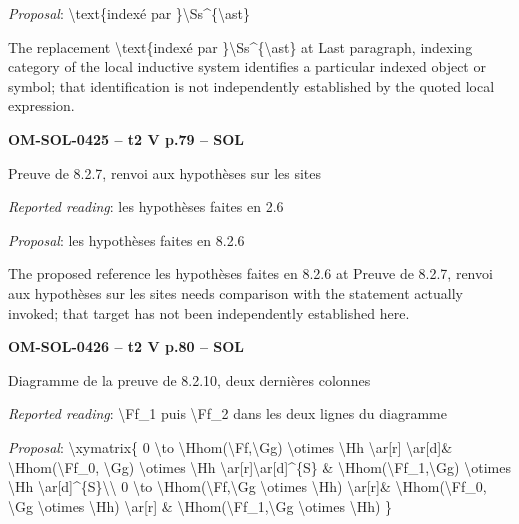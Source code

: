\emph{Proposal}: \textbackslash{}text\{indexé par \}\textbackslash{}Ss\textasciicircum{}\{\textbackslash{}ast\}\par
The replacement \textbackslash{}text\{indexé par \}\textbackslash{}Ss\textasciicircum{}\{\textbackslash{}ast\} at Last paragraph, indexing category of the local inductive system identifies a particular indexed object or symbol; that identification is not independently established by the quoted local expression.\par
\par\noindent\textbf{OM-SOL-0425 -- t2 V p.79 -- SOL}\par
Preuve de 8.2.7, renvoi aux hypothèses sur les sites\par
\emph{Reported reading}: les hypothèses faites en 2.6\par
\emph{Proposal}: les hypothèses faites en 8.2.6\par
The proposed reference les hypothèses faites en 8.2.6 at Preuve de 8.2.7, renvoi aux hypothèses sur les sites needs comparison with the statement actually invoked; that target has not been independently established here.\par
\par\noindent\textbf{OM-SOL-0426 -- t2 V p.80 -- SOL}\par
Diagramme de la preuve de 8.2.10, deux dernières colonnes\par
\emph{Reported reading}: \textbackslash{}Ff\_1 puis \textbackslash{}Ff\_2 dans les deux lignes du diagramme\par
\emph{Proposal}: \textbackslash{}xymatrix\{ 0 \textbackslash{}to \textbackslash{}Hhom(\textbackslash{}Ff,\textbackslash{}Gg) \textbackslash{}otimes \textbackslash{}Hh \textbackslash{}ar[r] \textbackslash{}ar[d]\& \textbackslash{}Hhom(\textbackslash{}Ff\_0, \textbackslash{}Gg) \textbackslash{}otimes \textbackslash{}Hh \textbackslash{}ar[r]\textbackslash{}ar[d]\textasciicircum{}\{S\} \& \textbackslash{}Hhom(\textbackslash{}Ff\_1,\textbackslash{}Gg) \textbackslash{}otimes \textbackslash{}Hh \textbackslash{}ar[d]\textasciicircum{}\{S\}\textbackslash{}\textbackslash{} 0 \textbackslash{}to \textbackslash{}Hhom(\textbackslash{}Ff,\textbackslash{}Gg \textbackslash{}otimes \textbackslash{}Hh) \textbackslash{}ar[r]\& \textbackslash{}Hhom(\textbackslash{}Ff\_0, \textbackslash{}Gg \textbackslash{}otimes \textbackslash{}Hh) \textbackslash{}ar[r] \& \textbackslash{}Hhom(\textbackslash{}Ff\_1,\textbackslash{}Gg \textbackslash{}otimes \textbackslash{}Hh) \}\par
